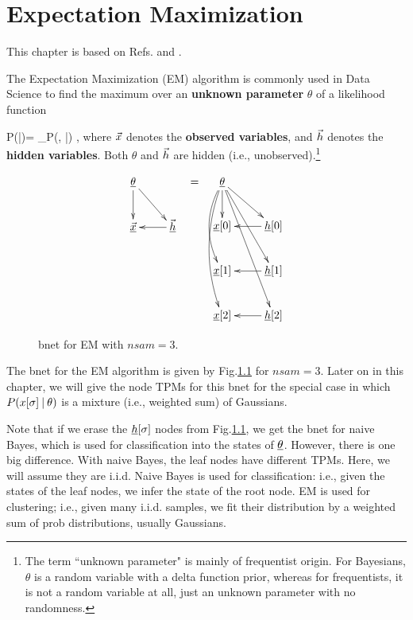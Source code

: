\chapter{Expectation Maximization}
\label{ch-emax}

This chapter is based on 
Refs.\cite{wiki-em}
and \cite{emory-biostat}.

The Expectation Maximization (EM) 
algorithm 
is commonly used in Data Science 
to find the maximum
over an {\bf unknown parameter} $\theta$ of a
 likelihood function 

\beq
P(\vecx|\theta)=
\sum_\vech P(\vecx, \vech|\theta)
\;,
\eeq
where ${\vec{x}}$
denotes the {\bf observed variables},
and ${\vec{h}}$ denotes the
{\bf hidden variables}.
Both $\theta$
and ${\vec{h}}$
are hidden (i.e.,
unobserved).\footnote{
The term
``unknown parameter"
is mainly of frequentist origin.
For Bayesians, $\theta$
is a random variable with
a delta function prior,
whereas for frequentists,
it is not
a random variable at all, 
just an unknown parameter
with no randomness.}



\begin{figure}[h!]
\centering
$$\begin{array}{ccc}
\xymatrix{
\ul{\theta}\ar[d]\ar[dr]
\\
\ul{\vecx}&\ul{\vech}\ar[l]
}
&=&
\xymatrix{
\ul{\theta}
\ar[d]
\ar@/_1pc/[dd]
\ar@/_1pc/[ddd]
\ar[rd]\ar[rdd]\ar[rddd]
\\
\rvx[0]
&\rvh[0]\ar[l]
\\
\rvx[1]
&\rvh[1]\ar[l]
\\
\rvx[2]
&\rvh[2]\ar[l]
}
\end{array}
$$
\caption{bnet for EM with $nsam=3$.}
\label{fig-em-bnet}
\end{figure}


The bnet for the EM algorithm
is given by Fig.\ref{fig-em-bnet}
for $nsam=3$.
Later on in this chapter,
we will give the node TPMs
for this bnet for
the special
case in which $P(x[\sigma]{\:\mathbf{|}\:} \theta)$
is a mixture (i.e., weighted sum)
of Gaussians.

Note that if we 
erase the ${\underline{h}}[\sigma]$ nodes
from Fig.\ref{fig-em-bnet},
we get the bnet for naive Bayes,
which is used for classification
into the states of $\underline{\theta}$.
However, there is one big
difference. 
With naive Bayes,
the leaf nodes have
different TPMs.
Here, we will assume they are i.i.d.
Naive Bayes is used for classification: i.e., 
given the states 
of the leaf nodes,
we infer the state of the root node.
EM is used for clustering; i.e.,
given many i.i.d. samples,
we fit their distribution by a weighted sum
of prob distributions,
usually Gaussians.

